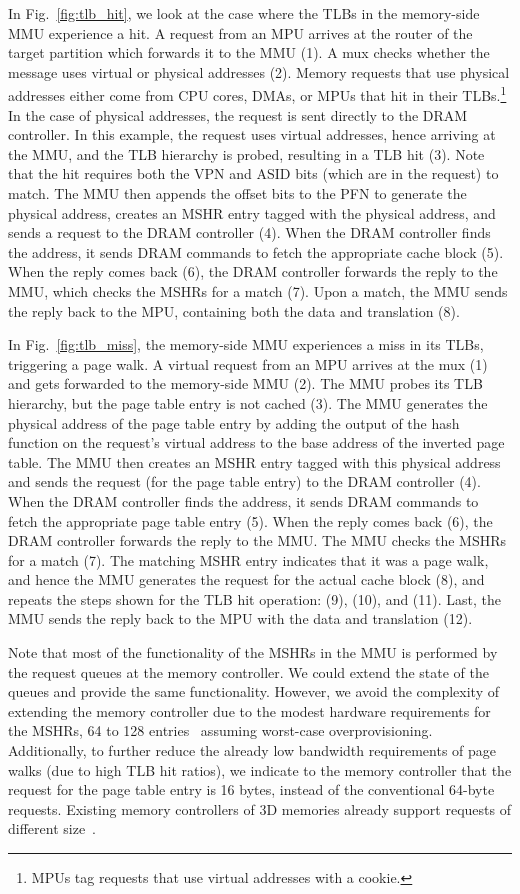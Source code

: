 In Fig.~\ref{fig:tlb_hit}, we look at the case where the TLBs in the memory-side MMU experience a hit. A request from an MPU arrives at the router of the target partition which forwards it to the MMU (1). A mux checks whether the message uses virtual or physical addresses (2). Memory requests that use physical addresses either come from CPU cores, DMAs, or MPUs that hit in their TLBs.\footnote{MPUs tag requests that use virtual addresses with a cookie.} In the case of physical addresses, the request is sent directly to the DRAM controller. In this example, the request uses virtual addresses, hence arriving at the MMU, and the TLB hierarchy is probed, resulting in a TLB hit (3). Note that the hit requires both the VPN and ASID bits (which are in the request) to match. The MMU then appends the offset bits to the PFN to generate the physical address, creates an MSHR entry tagged with the physical address, and sends a request to the DRAM controller (4). When the DRAM controller finds the address, it sends DRAM commands to fetch the appropriate cache block (5). When the reply comes back (6), the DRAM controller forwards the reply to the MMU, which checks the MSHRs for a match (7). Upon a match, the MMU sends the reply back to the MPU, containing both the data and translation (8).

In Fig.~\ref{fig:tlb_miss}, the memory-side MMU experiences a miss in its TLBs, triggering a page walk. A virtual request from an MPU arrives at the mux (1) and gets forwarded to the memory-side MMU (2). The MMU probes its TLB hierarchy, but the page table entry is not cached (3). The MMU generates the physical address of the page table entry by adding the output of the hash function on the request's virtual address to the base address of the inverted page table. The MMU then creates an MSHR entry tagged with this physical address and sends the request (for the page table entry) to the DRAM controller (4). When the DRAM controller finds the address, it sends DRAM commands to fetch the appropriate page table entry (5). When the reply comes back (6), the DRAM controller forwards the reply to the MMU. The MMU checks the MSHRs for a match (7). The matching MSHR entry indicates that it was a page walk, and hence the MMU generates the request for the actual cache block (8), and repeats the steps shown for the TLB hit operation: (9), (10), and (11). Last, the MMU sends the reply back to the MPU with the data and translation (12). 

Note that most of the functionality of the MSHRs in the MMU is performed by the request queues at the memory controller. We could extend the state of the queues and provide the same functionality. However, we avoid the complexity of extending the memory controller due to the modest hardware requirements for the MSHRs, 64 to 128 entries~\cite{lee:simultaneous} assuming worst-case overprovisioning. Additionally, to further reduce the already low bandwidth requirements of page walks (due to high TLB hit ratios), we indicate to the memory controller that the request for the page table entry is 16 bytes, instead of the conventional 64-byte requests. Existing memory controllers of 3D memories already support requests of different size~\cite{micron:hmc}.


